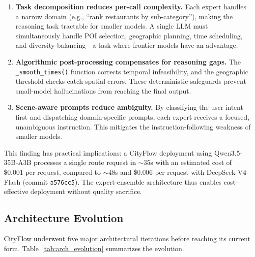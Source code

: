 \begin{enumerate}[leftmargin=*]
    \item \textbf{Task decomposition reduces per-call complexity.} Each expert handles a narrow domain (e.g., ``rank restaurants by sub-category''), making the reasoning task tractable for smaller models. A single LLM must simultaneously handle POI selection, geographic planning, time scheduling, and diversity balancing---a task where frontier models have an advantage.

    \item \textbf{Algorithmic post-processing compensates for reasoning gaps.} The \texttt{\_smooth\_times()} function corrects temporal infeasibility, and the geographic threshold checks catch spatial errors. These deterministic safeguards prevent small-model hallucinations from reaching the final output.

    \item \textbf{Scene-aware prompts reduce ambiguity.} By classifying the user intent first and dispatching domain-specific prompts, each expert receives a focused, unambiguous instruction. This mitigates the instruction-following weakness of smaller models.
\end{enumerate}

This finding has practical implications: a CityFlow deployment using Qwen3.5-35B-A3B processes a single route request in ${\sim}35$s with an estimated cost of \$0.001 per request, compared to ${\sim}48$s and \$0.006 per request with DeepSeek-V4-Flash (commit \texttt{a576cc5}). The expert-ensemble architecture thus enables cost-effective deployment without quality sacrifice.

\subsection{Architecture Evolution}

CityFlow underwent five major architectural iterations before reaching its current form. Table~\ref{tab:arch_evolution} summarizes the evolution.

\begin{table}[!t]
\centering
\caption{Architecture evolution milestones. Each iteration is identified by its commit hash.}
\label{tab:arch_evolution}
\end{table}

